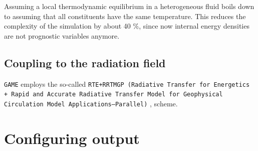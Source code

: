 \documentclass[10pt]{report}
\begin{document}
Assuming a local thermodynamic equilibrium in a heterogeneous fluid boils down to assuming that all constituents have the same temperature. This reduces the complexity of the simulation by about 40 \%, since now internal energy densities are not prognostic variables anymore.

\section{Coupling to the radiation field}
\label{sec:coupling_to_the_radiation_field}

\texttt{GAME} employs the so-called \texttt{RTE+RRTMGP (Radiative Transfer for Energetics + Rapid and Accurate Radiative Transfer Model for Geophysical Circulation Model Applications—Parallel)} \cite{doi:10.1029/2019MS001621}, \cite{rte-rrtmgp-github} scheme.

\chapter{Configuring output}
\label{sec:configuring_output}

\appendix

\printbibliography
\end{document}
